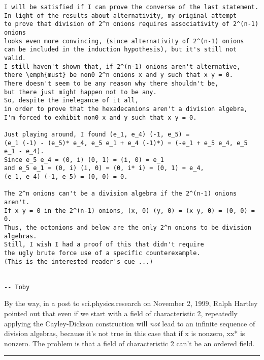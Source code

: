 \begin{verbatim}
I will be satisfied if I can prove the converse of the last statement.
In light of the results about alternativity, my original attempt
to prove that division of 2^n onions requires associativity of 2^(n-1) onions
looks even more convincing, (since alternativity of 2^(n-1) onions
can be included in the induction hypothesis), but it's still not valid.
I still haven't shown that, if 2^(n-1) onions aren't alternative,
there \emph{must} be non0 2^n onions x and y such that x y = 0.
There doesn't seem to be any reason why there shouldn't be,
but there just might happen not to be any.
So, despite the inelegance of it all,
in order to prove that the hexadecanions aren't a division algebra,
I'm forced to exhibit non0 x and y such that x y = 0.

Just playing around, I found (e_1, e_4) (-1, e_5) =
(e_1 (-1) - (e_5)* e_4, e_5 e_1 + e_4 (-1)*) = (-e_1 + e_5 e_4, e_5 e_1 - e_4).
Since e_5 e_4 = (0, i) (0, 1) = (i, 0) = e_1
and e_5 e_1 = (0, i) (i, 0) = (0, i* i) = (0, 1) = e_4,
(e_1, e_4) (-1, e_5) = (0, 0) = 0.

The 2^n onions can't be a division algebra if the 2^(n-1) onions aren't.
If x y = 0 in the 2^(n-1) onions, (x, 0) (y, 0) = (x y, 0) = (0, 0) = 0.
Thus, the octonions and below are the only 2^n onions to be division algebras.
Still, I wish I had a proof of this that didn't require
the ugly brute force use of a specific counterexample.
(This is the interested reader's cue ...)


-- Toby
\end{verbatim}
    

By the way, in a post to sci.physics.research on November 2, 1999, 
Ralph Hartley pointed out 
that even if we start with a field of characteristic 2, repeatedly
applying the Cayley-Dickson construction will \emph{not} lead to an
infinite sequence of division algebras, because it's not true
in this case that if x is nonzero, xx* is nonzero.  The problem is
that a field of characteristic 2 can't be an ordered field.



\par\noindent\rule{\textwidth}{0.4pt}
